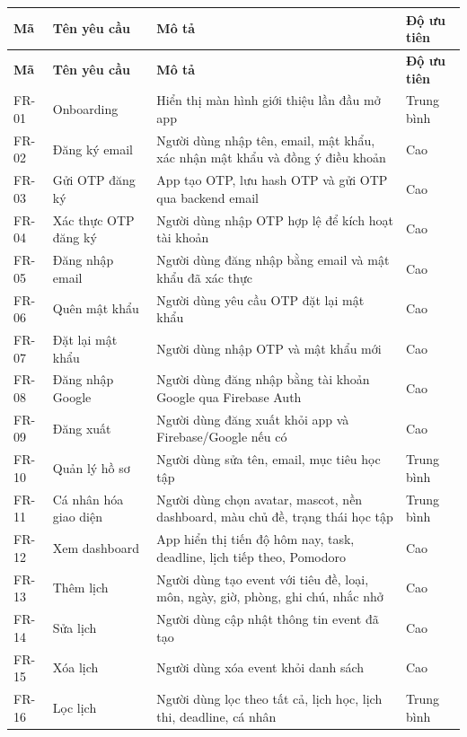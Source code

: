 \documentclass[12pt,a4paper]{report}
\begin{document}
\begin{longtable}{|>{\raggedright\arraybackslash}p{}|>{\raggedright\arraybackslash}p{}|>{\raggedright\arraybackslash}p{}|>{\raggedright\arraybackslash}p{}|}
\hline
\textbf{Mã} & \textbf{Tên yêu cầu} & \textbf{Mô tả} & \textbf{Độ ưu tiên} \\ \hline
\endfirsthead
\hline
\textbf{Mã} & \textbf{Tên yêu cầu} & \textbf{Mô tả} & \textbf{Độ ưu tiên} \\ \hline
\endhead
FR-01 & Onboarding & Hiển thị màn hình giới thiệu lần đầu mở app & Trung bình \\ \hline
FR-02 & Đăng ký email & Người dùng nhập tên, email, mật khẩu, xác nhận mật khẩu và đồng ý điều khoản & Cao \\ \hline
FR-03 & Gửi OTP đăng ký & App tạo OTP, lưu hash OTP và gửi OTP qua backend email & Cao \\ \hline
FR-04 & Xác thực OTP đăng ký & Người dùng nhập OTP hợp lệ để kích hoạt tài khoản & Cao \\ \hline
FR-05 & Đăng nhập email & Người dùng đăng nhập bằng email và mật khẩu đã xác thực & Cao \\ \hline
FR-06 & Quên mật khẩu & Người dùng yêu cầu OTP đặt lại mật khẩu & Cao \\ \hline
FR-07 & Đặt lại mật khẩu & Người dùng nhập OTP và mật khẩu mới & Cao \\ \hline
FR-08 & Đăng nhập Google & Người dùng đăng nhập bằng tài khoản Google qua Firebase Auth & Cao \\ \hline
FR-09 & Đăng xuất & Người dùng đăng xuất khỏi app và Firebase/Google nếu có & Cao \\ \hline
FR-10 & Quản lý hồ sơ & Người dùng sửa tên, email, mục tiêu học tập & Trung bình \\ \hline
FR-11 & Cá nhân hóa giao diện & Người dùng chọn avatar, mascot, nền dashboard, màu chủ đề, trạng thái học tập & Trung bình \\ \hline
FR-12 & Xem dashboard & App hiển thị tiến độ hôm nay, task, deadline, lịch tiếp theo, Pomodoro & Cao \\ \hline
FR-13 & Thêm lịch & Người dùng tạo event với tiêu đề, loại, môn, ngày, giờ, phòng, ghi chú, nhắc nhở & Cao \\ \hline
FR-14 & Sửa lịch & Người dùng cập nhật thông tin event đã tạo & Cao \\ \hline
FR-15 & Xóa lịch & Người dùng xóa event khỏi danh sách & Cao \\ \hline
FR-16 & Lọc lịch & Người dùng lọc theo tất cả, lịch học, lịch thi, deadline, cá nhân & Trung bình \\ \hline

\end{longtable}
\end{document}
